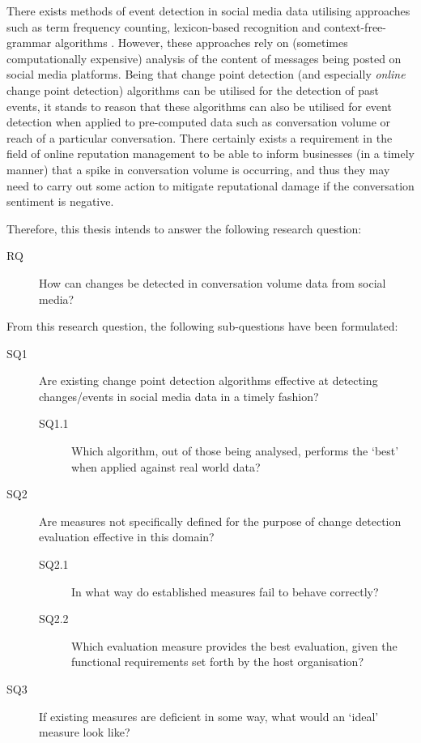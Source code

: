 \documentclass{uvamscse}	%
\begin{document}
There exists methods of event detection in social media data utilising approaches such as term frequency counting, lexicon-based recognition and context-free-grammar algorithms . However, these approaches rely on (sometimes computationally expensive) analysis of the content of messages being posted on social media platforms. Being that change point detection (and especially \emph{online} change point detection) algorithms can be utilised for the detection of past events, it stands to reason that these algorithms can also be utilised for event detection when applied to pre-computed data such as conversation volume or reach of a particular conversation. There certainly exists a requirement in the field of online reputation management to be able to inform businesses (in a timely manner) that a spike in conversation volume is occurring, and thus they may need to carry out some action to mitigate reputational damage if the conversation sentiment is negative.

Therefore, this thesis intends to answer the following research question:

\begin{description}
    \item[RQ] How can changes be detected in conversation volume data from social media?
\end{description}

From this research question, the following sub-questions have been formulated:

\begin{description}
	\item[SQ1] Are existing change point detection algorithms effective at detecting changes/events in social media data in a timely fashion?
	\begin{description}
	\item[SQ1.1] Which algorithm, out of those being analysed, performs the `best' when applied against real world data?
	\end{description}
	\item[SQ2] Are measures not specifically defined for the purpose of change detection evaluation effective in this domain?
	\begin{description}
	\item[SQ2.1] In what way do established measures fail to behave correctly?
    \item[SQ2.2] Which evaluation measure provides the best evaluation, given the functional requirements set forth by the host organisation?
    \end{description}
	\item[SQ3] If existing measures are deficient in some way, what would an `ideal' measure look like?
\end{description}
\end{document}
